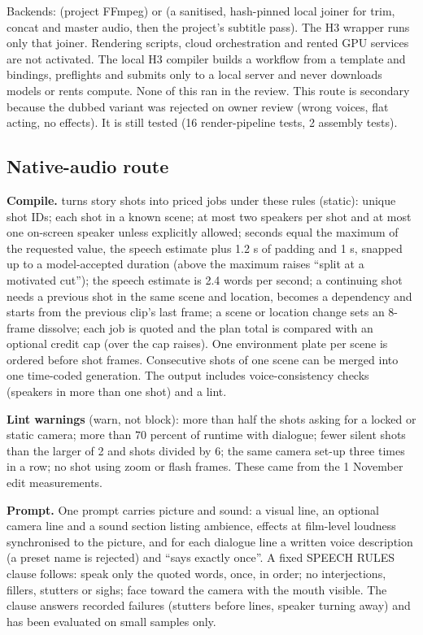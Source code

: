 \documentclass[11pt,a4paper]{article}
\newcommand{\code}[1]{\texttt{\detokenize{#1}}}
\begin{document}
Backends: \code{own} (project FFmpeg) or \code{h3_join} (a sanitised, hash-pinned local joiner for trim, concat and master audio, then the project's subtitle pass). The H3 wrapper runs only that joiner. Rendering scripts, cloud orchestration and rented GPU services are not activated. The local H3 compiler builds a workflow from a template and bindings, preflights and submits only to a local server and never downloads models or rents compute. None of this ran in the review. This route is secondary because the dubbed variant was rejected on owner review (wrong voices, flat acting, no effects). It is still tested (16 render-pipeline tests, 2 assembly tests).

\subsection{Native-audio route}
\textbf{Compile.} \code{plan-native} turns story shots into priced jobs under these rules (static): unique shot IDs; each shot in a known scene; at most two speakers per shot and at most one on-screen speaker unless explicitly allowed; seconds equal the maximum of the requested value, the speech estimate plus 1.2 s of padding and 1 s, snapped up to a model-accepted duration (above the maximum raises ``split at a motivated cut''); the speech estimate is 2.4 words per second; a continuing shot needs a previous shot in the same scene and location, becomes a dependency and starts from the previous clip's last frame; a scene or location change sets an 8-frame dissolve; each job is quoted and the plan total is compared with an optional credit cap (over the cap raises). One environment plate per scene is ordered before shot frames. Consecutive shots of one scene can be merged into one time-coded generation. The output includes voice-consistency checks (speakers in more than one shot) and a lint.

\textbf{Lint warnings} (warn, not block): more than half the shots asking for a locked or static camera; more than 70 percent of runtime with dialogue; fewer silent shots than the larger of 2 and shots divided by 6; the same camera set-up three times in a row; no shot using zoom or flash frames. These came from the 1 November edit measurements.

\textbf{Prompt.} One prompt carries picture and sound: a visual line, an optional camera line and a sound section listing ambience, effects at film-level loudness synchronised to the picture, and for each dialogue line a written voice description (a preset name is rejected) and ``says exactly once''. A fixed SPEECH RULES clause follows: speak only the quoted words, once, in order; no interjections, fillers, stutters or sighs; face toward the camera with the mouth visible. The clause answers recorded failures (stutters before lines, speaker turning away) and has been evaluated on small samples only.
\end{document}
